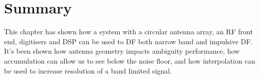 \section{Summary}
This chapter has shown how a system with a circular antenna array, an RF front end, digitisers and DSP can be used to DF both narrow band and impulsive DF. It's been shown how antenna geometry impacts ambiguity performance, how accumulation can allow us to see below the noise floor, and how interpolation can be used to increase resolution of a band limited signal.
